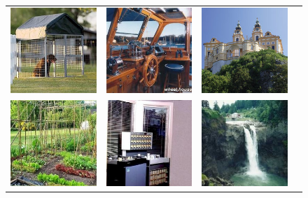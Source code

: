 \documentclass{beamer}
\begin{document}
\begin{frame}
\begin{figure}
{\begin{tabular}{cccc}
\includegraphics[width = 1.5in]{./images/sun397/kennel.jpg} &
\includegraphics[width = 1.5in]{./images/sun397/pilothouse.jpg} &
\includegraphics[width = 1.5in]{./images/sun397/abbey.jpg} \\
\includegraphics[width = 1.5in]{./images/sun397/vegetable_garden.jpg} &
\includegraphics[width = 1.5in]{./images/sun397/music_studio.jpg} &
\includegraphics[width = 1.5in]{./images/sun397/waterfall.jpg} &

\end{tabular}}
\end{figure}
\end{frame}
\end{document}
